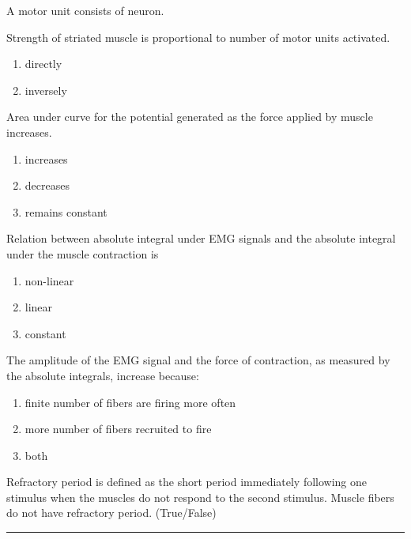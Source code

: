 \documentclass[11pt,paper=a4,answers]{exam}
\begin{document}
\begin{questions}

\pointsinrightmargin
\pointsdroppedatright
\marksnotpoints
\pointformat{\boldmath\themarginpoints}
\bracketedpoints
\question[01]
\label{Q:perunit}
A motor unit consists of \underline{\hspace{3cm}} neuron.
\droppoints

\question[01]
\label{Q:perunit}
Strength of striated muscle is \underline{\hspace{3cm}} proportional to number of motor units activated.
\droppoints
\begin{enumerate}[label=\alph*]
\item directly
\item inversely
\end{enumerate}

\question[01]
Area under curve for the potential generated \underline{\hspace{3cm}} as the force applied by muscle  
increases.
\droppoints
\begin{enumerate}[label=\alph*]
\item increases
\item decreases
\item remains constant
\end{enumerate}


\question[01]
Relation between absolute integral under EMG signals and the absolute integral under the muscle contraction
is \underline{\hspace{3cm}}
\droppoints
\begin{enumerate}[label=\alph*]
\item non-linear
\item linear
\item constant
\end{enumerate}

\question[02]
The amplitude of the EMG signal and the force of contraction, as measured by the absolute
integrals, increase because:
\droppoints
\begin{enumerate}[label=\alph*]
\item finite number of fibers are firing more often
\item more number of fibers recruited to fire
\item both
\end{enumerate}

\question[01]
Refractory period is defined as the short period immediately following one stimulus when the muscles do not respond to the second stimulus. Muscle fibers do not have refractory period. (True/False)
\droppoints

\end{questions}
\begin{center}
\rule{\textwidth}{1pt}
\end{center}
\end{document}
